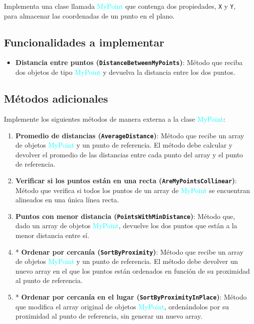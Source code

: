Implementa una clase llamada \textcolor{cyan}{MyPoint} que contenga dos propiedades, \texttt{X} y \texttt{Y}, para almacenar las coordenadas de un punto en el plano.

\subsection*{Funcionalidades a implementar}
\begin{itemize}
    \item \textbf{Distancia entre puntos (\texttt{DistanceBetweenMyPoints})}: 
    Método que reciba dos objetos de tipo \textcolor{cyan}{MyPoint} y devuelva la distancia entre los dos puntos.
\end{itemize}

\subsection*{Métodos adicionales}
Implemente los siguientes métodos de manera externa a la clase \textcolor{cyan}{MyPoint}:
\begin{enumerate}
    \item \textbf{Promedio de distancias (\texttt{AverageDistance})}: 
    Método que recibe un array de objetos \textcolor{cyan}{MyPoint} y un punto de referencia. El método debe calcular y devolver el promedio de las distancias entre cada punto del array y el punto de referencia.

     \item \textbf{Verificar si los puntos están en una recta (\texttt{AreMyPointsCollinear})}: 
    Método que verifica si todos los puntos de un array de \textcolor{cyan}{MyPoint} se encuentran alineados en una única línea recta.

    \item \textbf{Puntos con menor distancia (\texttt{PointsWithMinDistance})}: 
    Método que, dado un array de objetos \textcolor{cyan}{MyPoint}, devuelve los dos puntos que están a la menor distancia entre sí.

    \item * \textbf{Ordenar por cercanía (\texttt{SortByProximity})}: 
    Método que recibe un array de objetos \textcolor{cyan}{MyPoint} y un punto de referencia. El método debe devolver un nuevo array en el que los puntos están ordenados en función de su proximidad al punto de referencia.

    \item * \textbf{Ordenar por cercanía en el lugar (\texttt{SortByProximityInPlace})}: 
    Método que modifica el array original de objetos \textcolor{cyan}{MyPoint}, ordenándolos por su proximidad al punto de referencia, sin generar un nuevo array.
\end{enumerate}
